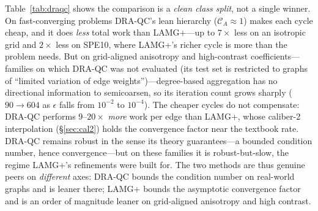 Table~\ref{tab:draqc} shows the comparison is a \emph{clean class split}, not a single winner.
On fast-converging problems DRA-QC's lean hierarchy ($\mathcal C_A\approx1$) makes each cycle
cheap, and it does \emph{less} total work than LAMG+---up to $7\times$ less on an isotropic grid
and $2\times$ less on SPE10, where LAMG+'s richer cycle is more than the problem needs. But on
grid-aligned anisotropy and high-contrast coefficients---families on which DRA-QC was not
evaluated \cite{napov-notay} (its test set is restricted to graphs of ``limited variation
of edge weights'')---degree-based aggregation has no directional information to semicoarsen, so
its iteration count grows sharply ($90\to604$ as $\epsilon$ falls from $10^{-2}$ to $10^{-4}$).
The cheaper cycles do not compensate: DRA-QC performs $9$--$20\times$ \emph{more} work per edge
than LAMG+, whose caliber-2 interpolation (\S\ref{sec:cal2}) holds the convergence factor near
the textbook rate. DRA-QC remains robust in the sense its theory guarantees---a bounded
condition number, hence convergence---but on these families it is robust-but-slow, the regime
LAMG+'s refinements were built for. The two methods are thus genuine peers on
\emph{different} axes: DRA-QC bounds the condition number on real-world graphs and is leaner
there; LAMG+ bounds the asymptotic convergence factor and is an order of magnitude leaner on
grid-aligned anisotropy and high contrast.
